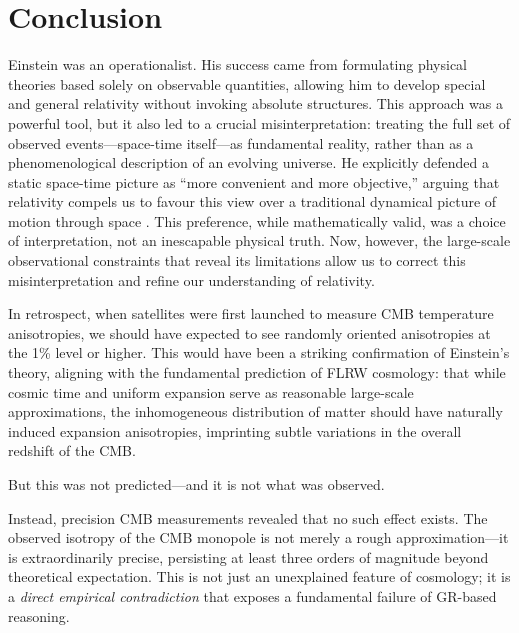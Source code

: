 \documentclass[aps,prd,reprint,superscriptaddress]{revtex4-2}
\begin{document}
\section{Conclusion}

Einstein was an operationalist. His success came from formulating physical theories based solely on observable quantities, allowing him to develop special and general relativity without invoking absolute structures. This approach was a powerful tool, but it also led to a crucial misinterpretation: treating the full set of observed events---space-time itself---as fundamental reality, rather than as a phenomenological description of an evolving universe. He explicitly defended a static space-time picture as ``more convenient and more objective,'' arguing that relativity compels us to favour this view over a traditional dynamical picture of motion through space \cite{Einstein1938}. This preference, while mathematically valid, was a choice of interpretation, not an inescapable physical truth. Now, however, the large-scale observational constraints that reveal its limitations allow us to correct this misinterpretation and refine our understanding of relativity.

In retrospect, when satellites were first launched to measure CMB temperature anisotropies, we should have expected to see randomly oriented anisotropies at the 1\% level or higher. This would have been a striking confirmation of Einstein's theory, aligning with the fundamental prediction of FLRW cosmology: that while cosmic time and uniform expansion serve as reasonable large-scale approximations, the inhomogeneous distribution of matter should have naturally induced expansion anisotropies, imprinting subtle variations in the overall redshift of the CMB.

But this was not predicted---and it is not what was observed.

Instead, precision CMB measurements revealed that no such effect exists. The observed isotropy of the CMB monopole is not merely a rough approximation---it is extraordinarily precise, persisting at least three orders of magnitude beyond theoretical expectation. This is not just an unexplained feature of cosmology; it is a \textit{direct empirical contradiction} that exposes a fundamental failure of GR-based reasoning.
\end{document}
